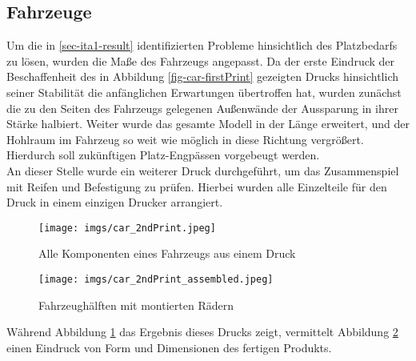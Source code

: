 \documentclass[.../Dokumentation.tex]{subfiles}
\begin{document}
\subsection{Fahrzeuge}\label{sec-ita2-cars}
Um die in \ref{sec-ita1-result} identifizierten Probleme hinsichtlich des 
Platzbedarfs zu lösen, wurden die Maße des Fahrzeugs angepasst.
Da der erste Eindruck der Beschaffenheit des in Abbildung 
\ref{fig-car-firstPrint} gezeigten Drucks hinsichtlich seiner Stabilität 
die anfänglichen Erwartungen übertroffen hat, wurden zunächst die zu den Seiten 
des Fahrzeugs gelegenen Außenwände der Aussparung in ihrer Stärke halbiert.
Weiter wurde das gesamte Modell in der Länge erweitert, und der Hohlraum im 
Fahrzeug so weit wie möglich in diese Richtung vergrößert. Hierdurch soll 
zukünftigen Platz-Engpässen vorgebeugt werden.\\
An dieser Stelle wurde ein weiterer Druck durchgeführt, um das 
Zusammenspiel mit Reifen und Befestigung zu prüfen. Hierbei wurden alle 
Einzelteile für den Druck in einem einzigen Drucker arrangiert.
\begin{figure}[H]
\begin{center}
    \texttt{[image: imgs/car\_2ndPrint.jpeg]}
    \caption{Alle Komponenten eines Fahrzeugs aus einem Druck}
    \label{fig-car-2ndPrint}
\end{center}
\end{figure}
\begin{figure}[H]
\begin{center}
    \texttt{[image: imgs/car\_2ndPrint\_assembled.jpeg]}
    \vspace*{-2.75cm}
    \caption{Fahrzeughälften mit montierten Rädern}
    \label{fig-car-2ndPrint-assembled}
\end{center}
\end{figure}
\noindent
Während Abbildung \ref{fig-car-2ndPrint} das Ergebnis dieses Drucks zeigt, 
vermittelt Abbildung \ref{fig-car-2ndPrint-assembled} einen Eindruck 
von Form und Dimensionen des fertigen Produkts.
\end{document}
